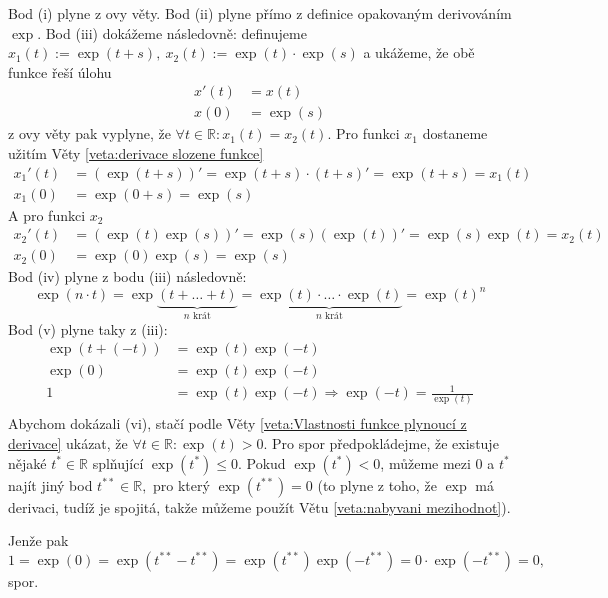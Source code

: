 \begin{důkaz}
  Bod (i) plyne z \PL ovy věty. Bod (ii) plyne přímo z definice opakovaným derivováním $\exp$.
   Bod (iii) dokážeme následovně: definujeme $x_1(t):= \exp(t+s),\ x_2(t):=\exp(t)\cdot \exp(s)$ a ukážeme, že obě funkce řeší úlohu
  \begin{align*}
	  x'(t)&= x(t)\\
	  x(0) &= \exp(s)
  \end{align*}
  z \PL ovy věty pak vyplyne, že $\forall t\in \mathbb{R}\colon x_1(t)=x_2(t).$ Pro funkci $x_1$ dostaneme užitím Věty \ref{veta:derivace slozene funkce}
  \begin{align*}
	  x_1'(t)&=(\exp(t+s))'=\exp(t+s)\cdot (t+s)' = \exp(t+s) = x_1(t) \\
	  x_1(0)&=\exp(0+s)=\exp(s)
  \end{align*}
  A pro funkci $x_2$
  \begin{align*}
    x_2'(t)&=(\exp(t)\exp(s))'=\exp(s)(\exp(t))'=\exp(s)\exp(t)=x_2(t) \\
    x_2(0)&=\exp(0)\exp(s)=\exp(s)
  \end{align*}
  Bod (iv) plyne z bodu (iii) následovně:
  \begin{equation*}
	  \exp(n\cdot t)=\exp\underbrace{(t+\hdots+t)}_{n \text{ krát}}=\underbrace{\exp(t)\cdot \hdots \cdot \exp(t) }_{n \text{ krát}}= \exp(t)^{n}
  \end{equation*}
  Bod (v) plyne taky z (iii):
  \begin{align*}
  	\exp(t+(-t)) &= \exp(t)\exp(-t) \\
  	\exp(0) &= \exp(t)\exp(-t) \\
	1 &= \exp(t)\exp(-t) \Rightarrow  \exp(-t)=\frac{1}{\exp(t)}\\
  \end{align*}
  Abychom dokázali (vi), stačí podle Věty \ref{veta:Vlastnosti funkce plynoucí z derivace} ukázat, že $\forall t\in \mathbb{R}\colon \exp(t)>0.$ Pro spor předpokládejme, že existuje nějaké $t^{*}\in \mathbb{R}$ splňující $\exp(t^{*})\leq 0$. Pokud $\exp(t^{*})<0$, můžeme mezi $0$ a $t^{*}$ najít jiný bod $t^{**}\in \mathbb{R},$ pro který $\exp(t^{**})=0$ (to plyne z toho, že $\exp$ má derivaci, tudíž je spojitá, takže můžeme použít Větu \ref{veta:nabyvani mezihodnot}).

  Jenže pak
  \begin{equation*}
    1=\exp(0)=\exp(t^{**}-t^{**})=\exp(t^{**})\exp(-t^{**})=0\cdot \exp(-t^{**})=0,
  \end{equation*}
  spor.
\end{důkaz}

